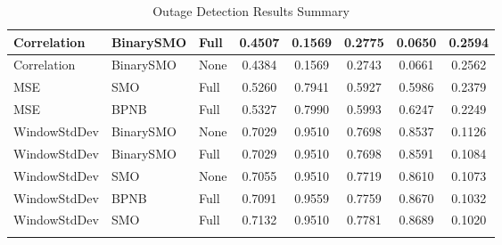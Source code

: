 {\begin{longtable}{|l|l|l|c|c|c|c|c|}
      \tabularnewline\hline
         Correlation & BinarySMO & Full & 0.4507 & 0.1569 & 0.2775 & 0.0650 & 0.2594
      \tabularnewline\hline
         Correlation & BinarySMO & None & 0.4384 & 0.1569 & 0.2743 & 0.0661 & 0.2562
      \tabularnewline\hline
         MSE & SMO & Full & 0.5260 & 0.7941 & 0.5927 & 0.5986 & 0.2379
      \tabularnewline\hline
         MSE & BPNB & Full & 0.5327 & 0.7990 & 0.5993 & 0.6247 & 0.2249
      \tabularnewline\hline
         WindowStdDev & BinarySMO & None & 0.7029 & 0.9510 & 0.7698 & 0.8537 & 0.1126
      \tabularnewline\hline
         WindowStdDev & BinarySMO & Full & 0.7029 & 0.9510 & 0.7698 & 0.8591 & 0.1084
      \tabularnewline\hline
         WindowStdDev & SMO & None & 0.7055 & 0.9510 & 0.7719 & 0.8610 & 0.1073
      \tabularnewline\hline
         WindowStdDev & BPNB & Full & 0.7091 & 0.9559 & 0.7759 & 0.8670 & 0.1032
      \tabularnewline\hline
         WindowStdDev & SMO & Full & 0.7132 & 0.9510 & 0.7781 & 0.8689 & 0.1020
      \tabularnewline\hline
      \caption[Outage Detection Results Summary]{Outage Detection Results Summary}
      \label{table:outage-detection-summary}
   \end{longtable}
}
